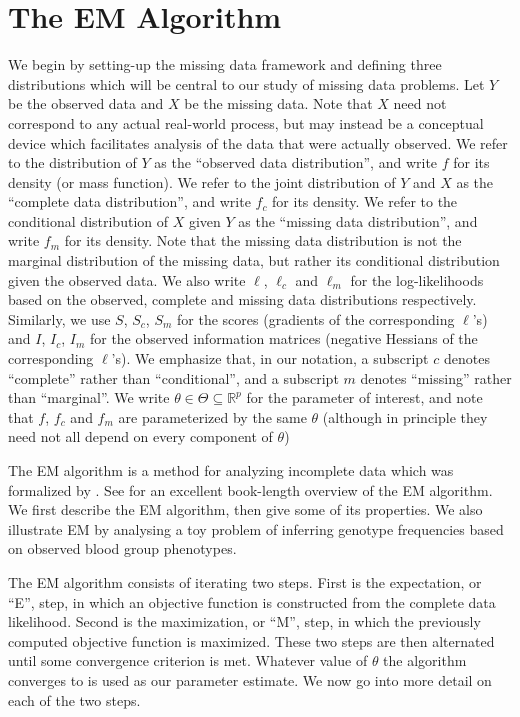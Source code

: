 \documentclass[11pt, oneside]{article}   	%
\newcommand{\bR}{\mathbb{R}}
\begin{document}
\section{The EM Algorithm}
\label{sec2:EM}

We begin by setting-up the missing data framework and defining three distributions which will be central to our study of missing data problems. Let $Y$ be the observed data and $X$ be the missing data. Note that $X$ need not correspond to any actual real-world process, but may instead be a conceptual device which facilitates analysis of the data that were actually observed. We refer to the distribution of $Y$ as the ``observed data distribution'', and write $f$ for its density (or mass function). We refer to the joint distribution of $Y$ and $X$ as the ``complete data distribution'', and write $f_c$ for its density. We refer to the conditional distribution of $X$ given $Y$ as the ``missing data distribution'', and write $f_m$ for its density. Note that the missing data distribution is not the marginal distribution of the missing data, but rather its conditional distribution given the observed data. We also write $\ell$, $\ell_c$ and $\ell_m$ for the log-likelihoods based on the observed, complete and missing data distributions respectively. Similarly, we use $S$, $S_c$, $S_m$ for the scores (gradients of the corresponding $\ell$'s) and $I$, $I_c$, $I_m$ for the observed information matrices (negative Hessians of the corresponding $\ell$'s). We emphasize that, in our notation, a subscript $c$ denotes ``complete'' rather than ``conditional'', and a subscript $m$ denotes ``missing'' rather than ``marginal''. We write $\theta \in \Theta \subseteq \bR^p$ for the parameter of interest, and note that $f$, $f_c$ and $f_m$ are parameterized by the same $\theta$ (although in principle they need not all depend on every component of $\theta$)

The EM algorithm is a method for analyzing incomplete data which was formalized by \citet{Dem77}. See \citet{McL08} for an excellent book-length overview of the EM algorithm. We first describe the EM algorithm, then give some of its properties. We also illustrate EM by analysing a toy problem of inferring genotype frequencies based on observed blood group phenotypes.

The EM algorithm consists of iterating two steps. First is the expectation, or ``E'', step, in which an objective function is constructed from the complete data likelihood. Second is the maximization, or ``M'', step, in which the previously computed objective function is maximized. These two steps are then alternated until some convergence criterion is met. Whatever value of $\theta$ the algorithm converges to is used as our parameter estimate. We now go into more detail on each of the two steps.
\end{document}
